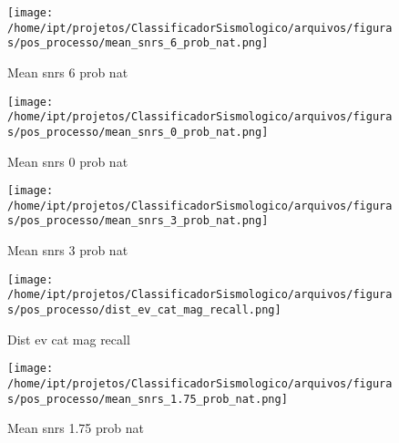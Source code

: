                     \begin{figure}[H]
                        \centering
                        \texttt{[image: /home/ipt/projetos/ClassificadorSismologico/arquivos/figuras/pos\_processo/mean\_snrs\_6\_prob\_nat.png]}
                        \caption{Mean snrs 6 prob nat}
                        \label{fig:mean_snrs_6_prob_nat}
                    \end{figure}
                

                    \begin{figure}[H]
                        \centering
                        \texttt{[image: /home/ipt/projetos/ClassificadorSismologico/arquivos/figuras/pos\_processo/mean\_snrs\_0\_prob\_nat.png]}
                        \caption{Mean snrs 0 prob nat}
                        \label{fig:mean_snrs_0_prob_nat}
                    \end{figure}
                

                    \begin{figure}[H]
                        \centering
                        \texttt{[image: /home/ipt/projetos/ClassificadorSismologico/arquivos/figuras/pos\_processo/mean\_snrs\_3\_prob\_nat.png]}
                        \caption{Mean snrs 3 prob nat}
                        \label{fig:mean_snrs_3_prob_nat}
                    \end{figure}
                

                    \begin{figure}[H]
                        \centering
                        \texttt{[image: /home/ipt/projetos/ClassificadorSismologico/arquivos/figuras/pos\_processo/dist\_ev\_cat\_mag\_recall.png]}
                        \caption{Dist ev cat mag recall}
                        \label{fig:dist_ev_cat_mag_recall}
                    \end{figure}
                

                    \begin{figure}[H]
                        \centering
                        \texttt{[image: /home/ipt/projetos/ClassificadorSismologico/arquivos/figuras/pos\_processo/mean\_snrs\_1.75\_prob\_nat.png]}
                        \caption{Mean snrs 1.75 prob nat}
                        \label{fig:mean_snrs_1.75_prob_nat}
                    \end{figure}
                

